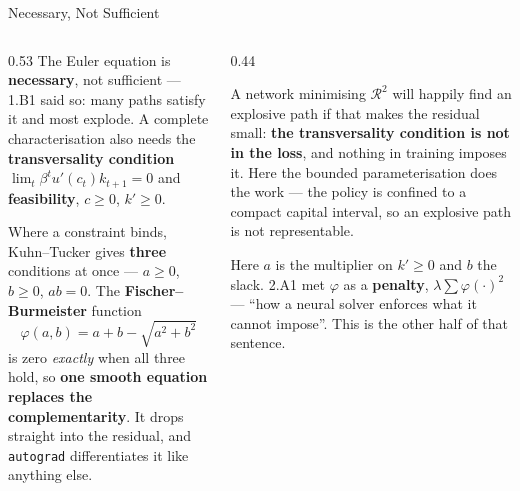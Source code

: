 \begin{frame}{Necessary, Not Sufficient}
\begin{columns}[T]
\begin{column}{0.53\textwidth}
\small
The Euler equation is \textbf{necessary}, not sufficient --- 1.B1 said so: many paths satisfy it and most explode. A complete characterisation also needs the \textbf{transversality condition} $\lim_{t}\beta^{t}u'(c_t)k_{t+1}=0$ and \textbf{feasibility}, $c\ge0$, $k'\ge0$.
\smallskip

Where a constraint binds, Kuhn--Tucker gives \textbf{three} conditions at once --- $a\ge0$, $b\ge0$, $ab=0$. The \textbf{Fischer--Burmeister} function
\[
  \varphi(a,b)=a+b-\sqrt{a^{2}+b^{2}}
\]
is zero \emph{exactly} when all three hold, so \textbf{one smooth equation replaces the complementarity}. It drops straight into the residual, and \texttt{autograd} differentiates it like anything else.
\end{column}
\begin{column}{0.44\textwidth}
\begin{cautionbox}[title=\textbf{Why this matters here}]\footnotesize
A network minimising $\mathcal{R}^{2}$ will happily find an explosive path if that makes the residual small: \textbf{the transversality condition is not in the loss}, and nothing in training imposes it. Here the bounded parameterisation does the work --- the policy is confined to a compact capital interval, so an explosive path is not representable.
\end{cautionbox}
\smallskip
{\footnotesize Here $a$ is the multiplier on $k'\ge0$ and $b$ the slack. 2.A1 met $\varphi$ as a \textbf{penalty}, $\lambda\sum\varphi(\cdot)^{2}$ --- ``how a neural solver enforces what it cannot impose''. This is the other half of that sentence.}
\end{column}
\end{columns}
\vspace{1mm}
\end{frame}

